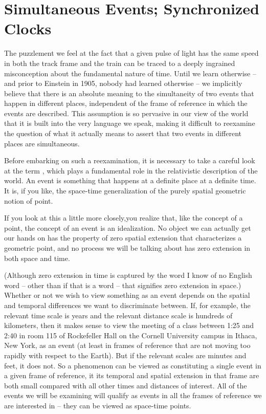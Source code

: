 \chapter{Simultaneous Events; Synchronized Clocks}
\label{ch:Morin_05}
The puzzlement we feel at the fact that a given pulse of light has the same speed in both the track frame and the train can be traced to a deeply ingrained misconception about the fundamental nature of time. Until we learn otherwise -- and prior to Einstein in 1905, nobody had learned otherwise -- we implicitly believe that there is an absolute meaning to the simultaneity of two events that happen in different places, independent of the frame of reference in which the events are described. This assumption is so pervasive in our view of the world that it is built into the very language we speak, making it difficult to reexamine the question of what it actually means to assert that two events in different places are simultaneous.

Before embarking on such a reexamination, it is necessary to take a careful look at the term , which plays a fundamental role in the relativistic description of the world. An event is something that happens at a definite place at a definite time. It is, if you like, the space-time generalization of the purely spatial geometric notion of point.

If you look at this a little more closely,you realize that, like the concept of a point, the concept of an event is an idealization. No object we can actually get our hands on has the property of zero spatial extension that characterizes a geometric point, and no process we will be talking about has zero extension in both space and time.

(Although zero extension in time is captured by the word  I know of no English word -- other than  if that is a word -- that signifies zero extension in space.) Whether or not we wish to view something as an event depends on the spatial and temporal differences we want to discriminate between. If, for example, the relevant time scale is years and the relevant distance scale is hundreds of kilometers, then it makes sense to view the meeting of a class between 1:25 and 2:40 in room 115 of Rockefeller Hall on the Cornell University campus in Ithaca, New York, as an event (at least in frames of reference that are not moving too rapidly with respect to the Earth). But if the relevant scales are minutes and feet, it does not. So a phenomenon can be viewed as constituting a single event in a given frame of reference, it its temporal and spatial extension in that frame are both small compared with all other times and distances of interest. All of the events we will be examining will qualify as events in all the frames of reference we are interested in -- they can be viewed as space-time points.

